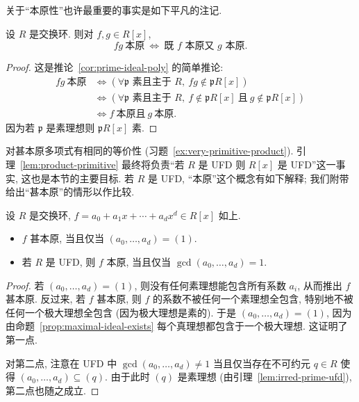 \noindent 关于``本原性''也许最重要的事实是如下平凡的注记.

\begin{lemma}\label{lem:product-primitive}
设 $R$ 是交换环. 则对 $f,g\in R[x]$,
\[
fg\ \text{本原}\ \Longleftrightarrow\ \text{既 } f \text{ 本原又 } g \text{ 本原}.
\]
\end{lemma}

\begin{proof}
这是推论~\ref{cor:prime-ideal-poly} 的简单推论:
\[
\begin{aligned}
fg\ \text{本原}
&\Longleftrightarrow (\forall\mathfrak p\text{ 素且主于 }R,\ fg\notin\mathfrak pR[x])\\
&\Longleftrightarrow (\forall\mathfrak p\text{ 素且主于 }R,\
  f\notin\mathfrak pR[x]\ \text{且}\ g\notin\mathfrak pR[x])\\
&\Longleftrightarrow f\ \text{本原且}\ g\ \text{本原}.
\end{aligned}
\]
因为若 $\mathfrak{p}$ 是素理想则 $\mathfrak{p}R[x]$ 素.
\end{proof}

\noindent 对甚本原多项式有相同的等价性 (习题~\ref{ex:very-primitive-product}). 引理~\ref{lem:product-primitive} 最终将负责``若 $R$ 是 UFD 则 $R[x]$ 是 UFD''这一事实, 这也是本节的主要目标. 若 $R$ 是 UFD, ``本原''这个概念有如下解释; 我们附带给出``甚本原''的情形以作比较.

\begin{lemma}\label{lem:primitive-interpret}
设 $R$ 是交换环, $f=a_0+a_1x+\cdots+a_dx^d\in R[x]$ 如上.
\begin{itemize}
\item $f$ 甚本原, 当且仅当 $(a_0,\dots,a_d)=(1)$.
\item 若 $R$ 是 UFD, 则 $f$ 本原, 当且仅当 $\gcd(a_0,\dots,a_d)=1$.
\end{itemize}
\end{lemma}

\begin{proof}
若 $(a_0,\dots,a_d)=(1)$, 则没有任何素理想能包含所有系数 $a_i$, 从而推出 $f$ 甚本原. 反过来, 若 $f$ 甚本原, 则 $f$ 的系数不被任何一个素理想全包含, 特别地不被任何一个极大理想全包含 (因为极大理想是素的). 于是 $(a_0,\dots,a_d)=(1)$, 因为由命题~\ref{prop:maximal-ideal-exists} 每个真理想都包含于一个极大理想. 这证明了第一点.

\noindent 对第二点, 注意在 UFD 中 $\gcd(a_0,\dots,a_d)\neq 1$ 当且仅当存在不可约元 $q\in R$ 使得 $(a_0,\dots,a_d)\subseteq (q)$. 由于此时 $(q)$ 是素理想 (由引理~\ref{lem:irred-prime-ufd}), 第二点也随之成立.
\end{proof}

